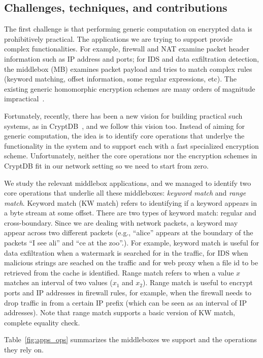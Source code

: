     \subsection{Challenges, techniques, and contributions}
    
The first challenge is that performing generic computation on encrypted data is prohibitively practical. The applications we are trying to support provide complex functionalities. For example, firewall and NAT examine packet header information such as IP address and ports; for IDS and data exfiltration detection, the middlebox (MB) examines packet payload and tries to match complex rules (keyword matching, offset information, some regular expressions, etc). The existing generic homomorphic encryption schemes are many orders of magnitude impractical~\cite{aesFHE}.

Fortunately, recently, there has been a new vision for building practical such systems, as in CryptDB~\cite{cryptdb}, and we follow this vision too. Instead of aiming for generic computation, the idea is to identify core operations that underlye the functionality in the system and to support each with a fast specialized encryption scheme. Unfortunately, neither the core operations nor the encryption schemes in CryptDB fit in our network setting so we need to start from zero.

We study the relevant middlebox applications, and we managed to identify two core operations that underlie all these middleboxes: {\em keyword match} and {\em range match}. Keyword match (KW match) refers to  identifying if a keyword appears in a byte stream at some offset. There are two types of keyword match: regular and cross-boundary. Since we are dealing with network packets, a keyword may appear across two different packets (e.g., ``alice'' appears at the boundary of the packets ``I see ali'' and ``ce at the zoo''.). For example, keyword match is useful for data exfiltration when a watermark is searched for in the traffic, for IDS when malicious strings are seached on the traffic and for web proxy when a file id to be retrieved from the cache is identified. 
Range match refers to when a value $x$ matches an interval of two values ($x_1$ and $x_2$). Range match is useful to encrypt ports and IP addresses in firewall rules, for example, when the firewall needs to drop traffic in from a certain IP prefix (which can be seen as an interval of IP addresses). Note that range match supports a basic version of KW match, complete equality check. 

Table~\ref{fig:apps_ops} summarizes the middleboxes we support and the operations they rely on. 





